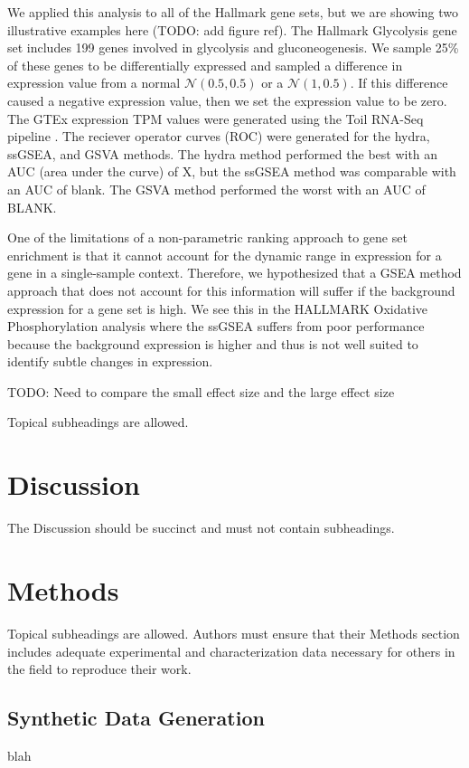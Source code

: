 \documentclass[fleqn,10pt]{wlscirep}
\begin{document}
We applied this analysis to all of the Hallmark gene sets, but we are showing two illustrative examples here (TODO: add figure ref). The Hallmark Glycolysis gene set includes 
199 genes involved in glycolysis and gluconeogenesis. We sample 25\% of these genes to be differentially expressed and sampled a difference in expression value from a normal $\mathcal{N}(0.5, 0.5)$ or a $\mathcal{N}(1, 0.5)$. If this difference caused a negative expression value, then we set the expression value to be zero. The GTEx expression TPM values were generated using the Toil RNA-Seq pipeline \cite{vivian2017toil}. The reciever operator curves (ROC) were generated for the hydra, ssGSEA, and GSVA methods. The hydra method performed the best with an AUC (area under the curve) of X, but the ssGSEA method was comparable with an AUC of blank. The GSVA method performed the worst with an AUC of BLANK. 

One of the limitations of a non-parametric ranking approach to gene set enrichment is that it cannot account for the dynamic range in expression for a gene in a single-sample context. Therefore, we hypothesized that a GSEA method approach that does not account for this information will suffer if the background expression for a gene set is high. We see this in the HALLMARK Oxidative Phosphorylation analysis where the ssGSEA suffers from poor performance because the background expression is higher and thus is not well suited to identify subtle changes in expression.

TODO: Need to compare the small effect size and the large effect size 

Topical subheadings are allowed.

\section*{Discussion}

The Discussion should be succinct and must not contain subheadings.

\section*{Methods}

Topical subheadings are allowed. Authors must ensure that their Methods section includes adequate experimental and characterization data necessary for others in the field to reproduce their work.
\subsection{Synthetic Data Generation}
blah
\end{document}
